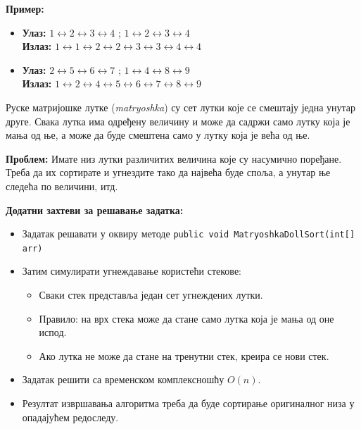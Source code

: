 \textbf{Пример:}

\begin{itemize}
    \item \textbf{Улаз:} $1 \leftrightarrow 2 \leftrightarrow 3 \leftrightarrow 4$  ; \quad $1 \leftrightarrow 2 \leftrightarrow 3 \leftrightarrow 4$ \\
          \textbf{Излаз:} $1 \leftrightarrow 1 \leftrightarrow 2 \leftrightarrow 2 \leftrightarrow 3 \leftrightarrow 3 \leftrightarrow 4 \leftrightarrow 4$
    \item \textbf{Улаз:} $2 \leftrightarrow 5 \leftrightarrow 6 \leftrightarrow 7$ ; \quad $1 \leftrightarrow 4 \leftrightarrow 8 \leftrightarrow 9$ \\
          \textbf{Излаз:} $1 \leftrightarrow 2 \leftrightarrow 4 \leftrightarrow 5 \leftrightarrow 6 \leftrightarrow 7 \leftrightarrow 8 \leftrightarrow 9$
\end{itemize}

Руске матријошке лутке (\textit{matryoshka}) су сет лутки које се смештају једна унутар друге. Свака лутка има одређену величину и може да садржи само лутку која је мања од ње, а може да буде смештена само у лутку која је већа од ње.

\textbf{Проблем:} Имате низ лутки различитих величина које су насумично поређане. Треба да их сортирате и угнездите тако да највећа буде споља, а унутар ње следећа по величини, итд.

\textbf{Додатни захтеви за решавање задатка:}
\begin{itemize}
    \item Задатак решавати у оквиру методе \texttt{public void MatryoshkaDollSort(int[] arr)}
    \item Затим симулирати угнеждавање користећи стекове:
    \begin{itemize}
        \item Сваки стек представља један сет угнеждених лутки.
        \item Правило: на врх стека може да стане само лутка која је мања од оне испод.
        \item Ако лутка не може да стане на тренутни стек, креира се нови стек.
    \end{itemize}
    \item Задатак решити са временском комплексношћу $O(n)$.
    \item Резултат извршавања алгоритма треба да буде сортирање оригиналног низа у опадајућем редоследу.
\end{itemize}

